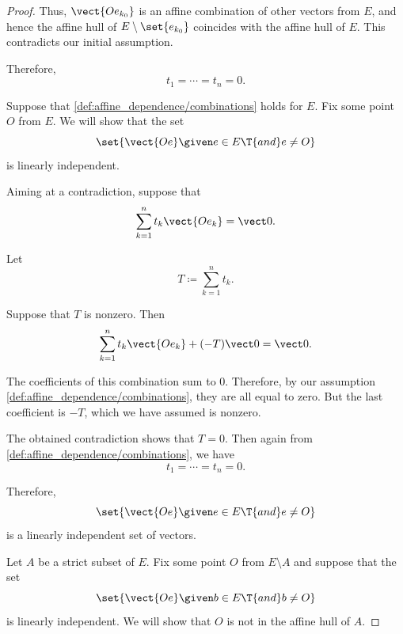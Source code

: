 \begin{proof}
  Thus, \( \vect{O e_{k_0}} \) is an affine combination of other vectors from \( E \), and hence the affine hull of \( E \setminus \set{ e_{k_0} } \) coincides with the affine hull of \( E \). This contradicts our initial assumption.

  Therefore,
  \begin{equation*}
    t_1 = \cdots = t_n = 0.
  \end{equation*}

   Suppose that \cref{def:affine_dependence/combinations} holds for \( E \). Fix some point \( O \) from \( E \). We will show that the set
  \begin{equation*}
    \set{ \vect{O e} \given e \in E \T{and} e \neq O }
  \end{equation*}
  is linearly independent.

  Aiming at a contradiction, suppose that
  \begin{equation*}
    \sum_{k=1}^n t_k \vect{O e_k} = \vect 0.
  \end{equation*}

  Let
  \begin{equation*}
    T \coloneqq \sum_{k=1}^n t_k.
  \end{equation*}

  Suppose that \( T \) is nonzero. Then
  \begin{equation*}
    \sum_{k=1}^n t_k \vect{O e_k} + (-T) \vect 0 = \vect 0.
  \end{equation*}

  The coefficients of this combination sum to \( 0 \). Therefore, by our assumption \cref{def:affine_dependence/combinations}, they are all equal to zero. But the last coefficient is \( -T \), which we have assumed is nonzero.

  The obtained contradiction shows that \( T = 0 \). Then again from \cref{def:affine_dependence/combinations}, we have
  \begin{equation*}
    t_1 = \cdots = t_n = 0.
  \end{equation*}

  Therefore,
  \begin{equation*}
    \set{ \vect{O e} \given e \in E \T{and} e \neq O }
  \end{equation*}
  is a linearly independent set of vectors.

   Let \( A \) be a strict subset of \( E \). Fix some point \( O \) from \( E \setminus A \) and suppose that the set
  \begin{equation*}
    \set{ \vect{O e} \given b \in E \T{and} b \neq O }
  \end{equation*}
  is linearly independent. We will show that \( O \) is not in the affine hull of \( A \).


\end{proof}
